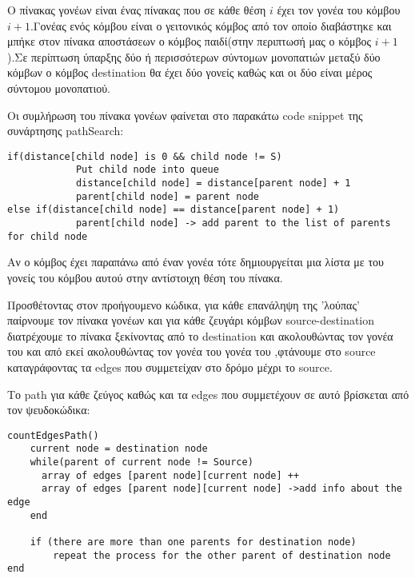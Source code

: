 \documentclass{article}
\begin{document}
Ο πίνακας γονέων είναι ένας πίνακας που σε κάθε θέση $i$ έχει τον γονέα του κόμβου $i+1$.Γονέας ενός κόμβου είναι ο γειτονικός κόμβος από τον οποίο διαβάστηκε και μπήκε στον πίνακα αποστάσεων ο κόμβος παιδί(στην περιπτωσή μας ο κόμβος $i+1$).Σε περίπτωση ύπαρξης δύο ή περισσότερων σύντομων μονοπατιών μεταξύ δύο κόμβων ο κόμβος destination θα έχει δύο γονείς καθώς και οι δύο είναι μέρος σύντομου μονοπατιού.\bigbreak

Οι συμλήρωση του πίνακα γονέων φαίνεται στο παρακάτω code snippet της συνάρτησης pathSearch:

\begin{lstlisting}
if(distance[child node] is 0 && child node != S)
			Put child node into queue
			distance[child node] = distance[parent node] + 1
			parent[child node] = parent node
else if(distance[child node] == distance[parent node] + 1)
			parent[child node] -> add parent to the list of parents for child node
\end{lstlisting}\bigbreak
{}
\bigbreak
Αν ο κόμβος έχει παραπάνω από έναν γονέα τότε δημιουργείται μια λίστα με του γονείς του κόμβου αυτού στην αντίστοιχη θέση του πίνακα.\bigbreak

Προσθέτοντας στον προήγουμενο κώδικα, για κάθε επανάληψη της 'λούπας' παίρνουμε τον πίνακα γονέων και για κάθε ζευγάρι κόμβων source-destination διατρέχουμε το πίνακα ξεκίνοντας από το destination και ακολουθώντας τον γονέα του και από εκεί ακολουθώντας τον γονέα του γονέα του ,φτάνουμε στο source καταγράφοντας τα edges που συμμετείχαν στο δρόμο μέχρι το source.\pagebreak

Το path για κάθε ζεύγος καθώς και τα edges που συμμετέχουν σε αυτό βρίσκεται από τον ψευδοκώδικα:

\begin{lstlisting}
countEdgesPath()
	current node = destination node
	while(parent of current node != Source)
	  array of edges [parent node][current node] ++
	  array of edges [parent node][current node] ->add info about the edge
	end
	
	if (there are more than one parents for destination node)
		repeat the process for the other parent of destination node
end
\end{lstlisting}
\end{document}
